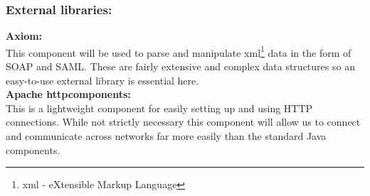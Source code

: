     \subsubsection{External libraries:}
\indent \indent \textbf{Axiom:}\\
This component will be used to parse and manipulate \gls{xml}\footnote{\gls{xml} - eXtensible Markup Language} data in the form of SOAP and SAML. These are fairly extensive and complex data structures so an easy-to-use external library is essential here. \\

\indent \textbf{Apache \gls{httpcomponents}:}\\
This is a lightweight component for easily setting up and using HTTP connections. While not strictly necessary this component will allow us to connect and communicate across networks far more easily than the standard Java components.

